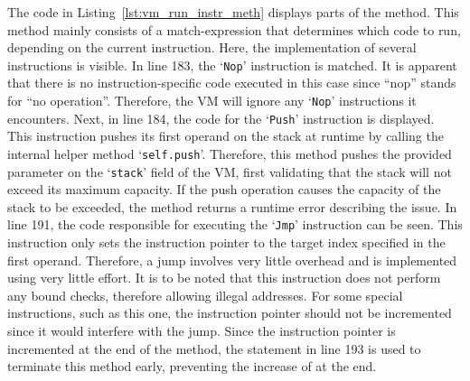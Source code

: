 
The code in Listing~\ref{lst:vm_run_instr_meth} displays parts of the  method.
This method mainly consists of a match-expression that determines which code to run, depending on the current instruction.
Here, the implementation of several instructions is visible.
In line 183, the `\texttt{Nop}' instruction is matched.
It is apparent that there is no instruction-specific code executed in this case since \enquote{nop} stands for \enquote{no operation}.
Therefore, the VM will ignore any `\texttt{Nop}' instructions it encounters.
Next, in line 184, the code for the `\texttt{Push}' instruction is displayed.
This instruction pushes its first operand on the stack at runtime by calling the internal helper method `\texttt{self.push}'.
Therefore, this method pushes the provided parameter on the `\texttt{stack}' field of the VM,
first validating that the stack will not exceed its maximum capacity.
If the push operation causes the capacity of the stack to be exceeded, the method returns a runtime error describing the issue.
In line 191, the code responsible for executing the `\texttt{Jmp}' instruction can be seen.
This instruction only sets the instruction pointer to the target index specified in the first operand.
Therefore, a jump involves very little overhead and is implemented using very little effort.
It is to be noted that this instruction does not perform any bound checks, therefore allowing illegal addresses.
For some special instructions, such as this one, the instruction pointer should not be incremented since it would interfere with the jump.
Since the instruction pointer is incremented at the end of the method, the  statement in line 193 is used to terminate this method early, preventing the increase of  at the end.

